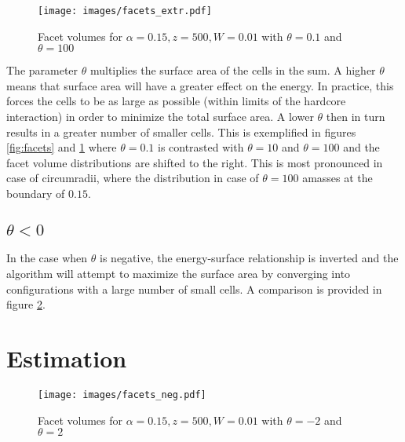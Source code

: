 \documentclass[12pt,a4paper]{report}
\begin{document}
\begin{figure}[h]
    \centering
    \texttt{[image: images/facets\_extr.pdf]}
    \caption{Facet volumes for $\alpha = 0.15, z = 500, W = 0.01$ with $\theta=0.1$ and $\theta=100$}
    \label{fig:facets_extr}
\end{figure}
The parameter $\theta$ multiplies the surface area of the cells in the sum. A higher $\theta$ means that surface area will have a greater effect on the energy. In practice, this forces the cells to be as large as possible (within limits of the hardcore interaction) in order to minimize the total surface area. A lower $\theta$ then in turn results in a greater number of smaller cells. This is exemplified in figures \ref{fig:facets} and \ref{fig:facets_extr} where $\theta=0.1$ is contrasted with $\theta=10$ and $\theta=100$ and the facet volume distributions are shifted to the right. This is most pronounced in case of circumradii, where the distribution in case of $\theta=100$ amasses at the boundary of $0.15$. 


\subsection{$\theta < 0$}
In the case when $\theta$ is negative, the energy-surface relationship is inverted and the algorithm will attempt to maximize the surface area by converging into configurations with a large number of small cells. A comparison is provided in figure \ref{fig:facets_neg}. \newline 


\section{Estimation}
\begin{figure}[h]
    \centering
    \texttt{[image: images/facets\_neg.pdf]}
    \caption{Facet volumes for $\alpha = 0.15, z = 500, W = 0.01$ with $\theta=-2$ and $\theta=2$}
    \label{fig:facets_neg}
\end{figure}
\end{document}

